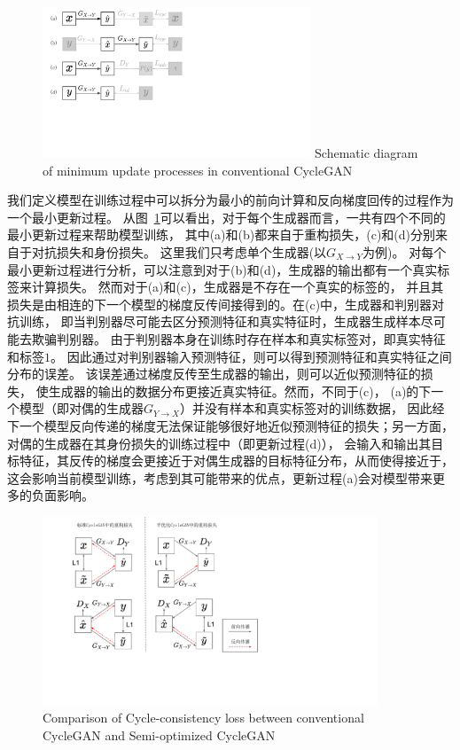 \begin{figure}[!htp]
    \centering
    \includegraphics[width=8cm,trim=0 150 300 0,clip]{figure/4_dataflow.pdf}
    {Schematic diagram of minimum update processes in conventional CycleGAN}
    \label{fig:dataflow}
\end{figure}

我们定义模型在训练过程中可以拆分为最小的前向计算和反向梯度回传的过程作为一个最小更新过程。
从图~\ref{fig:dataflow}可以看出，对于每个生成器而言，一共有四个不同的最小更新过程来帮助模型训练，
其中(a)和(b)都来自于重构损失，(c)和(d)分别来自于对抗损失和身份损失。
这里我们只考虑单个生成器(以$G_{X\rightarrow Y}$为例)。
对每个最小更新过程进行分析，可以注意到对于(b)和(d)，生成器的输出都有一个真实标签来计算损失。
然而对于(a)和(c)，生成器是不存在一个真实的标签的，
并且其损失是由相连的下一个模型的梯度反传间接得到的。在(c)中，生成器和判别器对抗训练，
即当判别器尽可能去区分预测特征和真实特征时，生成器生成样本尽可能去欺骗判别器。
由于判别器本身在训练时存在样本和真实标签对，即真实特征和标签$1$。
因此通过对判别器输入预测特征，则可以得到预测特征和真实特征之间分布的误差。
该误差通过梯度反传至生成器的输出，则可以近似预测特征的损失，
使生成器的输出的数据分布更接近真实特征。然而，不同于(c)，
(a)的下一个模型（即对偶的生成器$G_{Y\rightarrow X}$）并没有样本和真实标签对的训练数据，
因此经下一个模型反向传递的梯度无法保证能够很好地近似预测特征的损失；另一方面，
对偶的生成器在其身份损失的训练过程中（即更新过程(d)），
会输入和输出其目标特征，其反传的梯度会更接近于对偶生成器的目标特征分布，从而使得接近于，
这会影响当前模型训练，考虑到其可能带来的优点，更新过程(a)会对模型带来更多的负面影响。

\begin{figure}[!htp]
    \centering
    \includegraphics[width=10cm,trim=0 110 250 0,clip]{figure/4_semi.pdf}
    {Comparison of Cycle-consistency loss between conventional CycleGAN and Semi-optimized CycleGAN}
    \label{fig:semi}
\end{figure}

